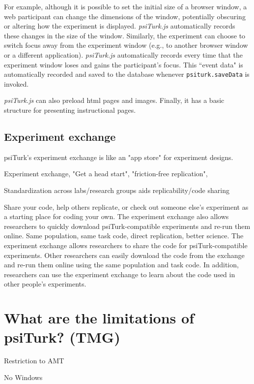 \documentclass[jou,apacite]{apa6}
\begin{document}
\begin{enumerate}
For example, although it is possible to set the initial size of a browser window, a web participant can change the dimensions of the window, potentially obscuring or altering how the experiment is displayed.
\emph{psiTurk.js} automatically records these changes in the size of the window.
Similarly, the experiment can choose to switch focus away from the experiment window (e.g., to another browser window or a different application).
\emph{psiTurk.js} automatically records every time that the experiment window loses and gains the participant's focus.
This ``event data" is automatically recorded and saved to the database whenever \texttt{psiturk.saveData} is invoked.

\end{enumerate}

\emph{psiTurk.js} can also preload html pages and images.
Finally, it has a basic structure for presenting instructional pages.

\subsection{Experiment exchange}

psiTurk's experiment exchange is like an "app store" for experiment designs. 

Experiment exchange, "Get a head start", "friction-free replication", 

Standardization across labs/research groups aids replicability/code sharing


Share your code, help others replicate, or check out someone else's experiment as a starting place for coding your own. The experiment exchange also allows researchers to quickly download psiTurk-compatible experiments and re-run them online. Same population, same task code, direct replication, better science.
The experiment exchange allows researchers to share the code for psiTurk-compatible experiments. Other researchers can easily download the code from the exchange and re-run them online using the same population and task code. In addition, researchers can use the experiment exchange to learn about the code used in other people's experiments. 


\section{What are the limitations of psiTurk? (TMG)}

Restriction to AMT

No Windows
\end{document}
